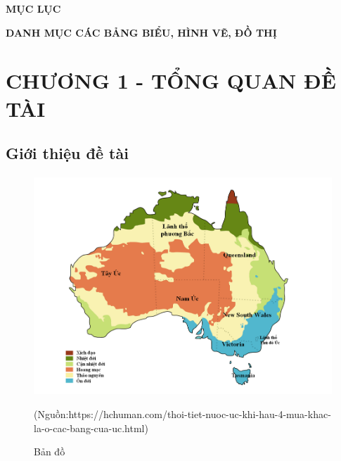 \documentclass{article}
\makeatletter
\renewcommand{\tableofcontents}{%
  \@starttoc{toc}%
}
\makeatother
\begin{document}
\setcounter{page}{1}
\begin{center}
	\fontsize{16}{20}\selectfont
	\textbf{MỤC LỤC\\}
\end{center}
\tableofcontents
\pagebreak

\begin{center}
	\fontsize{16}{20}\selectfont
	\textbf{DANH MỤC CÁC BẢNG BIỂU, HÌNH VẼ, ĐỒ THỊ}
\end{center}
\listoffigures
\listoftables
\pagebreak

\section*{CHƯƠNG 1 - TỔNG QUAN ĐỀ TÀI}
\setcounter{section}{1}

\subsection{Giới thiệu đề tài}
\paragraph{}


\begin{figure}[!h]
	\begin{center}
		\includegraphics[width=\linewidth]{images/Bando.png}
		\caption{\fontsize{14}{20}\selectfont Bản đồ}
         (Nguồn:https://hchuman.com/thoi-tiet-nuoc-uc-khi-hau-4-mua-khac-la-o-cac-bang-cua-uc.html)
	\end{center}
\end{figure}
\pagebreak
\end{document}
